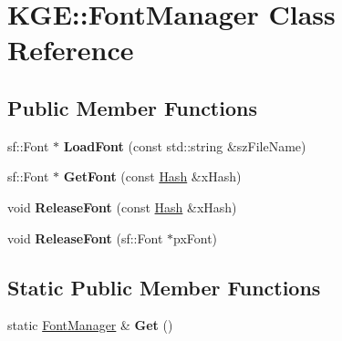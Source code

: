\hypertarget{class_k_g_e_1_1_font_manager}{\section{K\-G\-E\-:\-:Font\-Manager Class Reference}
\label{class_k_g_e_1_1_font_manager}
}
\subsection*{Public Member Functions}
\begin{DoxyCompactItemize}
\item 
\hypertarget{class_k_g_e_1_1_font_manager_aeabc37b99ae4a625e3a95939deccc5ca}{sf\-::\-Font $\ast$ {\bfseries Load\-Font} (const std\-::string \&sz\-File\-Name)}\label{class_k_g_e_1_1_font_manager_aeabc37b99ae4a625e3a95939deccc5ca}

\item 
\hypertarget{class_k_g_e_1_1_font_manager_a0c5c972ea0d8e338e782de13b9b8ed08}{sf\-::\-Font $\ast$ {\bfseries Get\-Font} (const \hyperlink{class_k_g_e_1_1_hash}{Hash} \&x\-Hash)}\label{class_k_g_e_1_1_font_manager_a0c5c972ea0d8e338e782de13b9b8ed08}

\item 
\hypertarget{class_k_g_e_1_1_font_manager_a9961469754e993e6b6e3f35be5cdd276}{void {\bfseries Release\-Font} (const \hyperlink{class_k_g_e_1_1_hash}{Hash} \&x\-Hash)}\label{class_k_g_e_1_1_font_manager_a9961469754e993e6b6e3f35be5cdd276}

\item 
\hypertarget{class_k_g_e_1_1_font_manager_aa15a96333b820a1738b43e74a40ffd36}{void {\bfseries Release\-Font} (sf\-::\-Font $\ast$px\-Font)}\label{class_k_g_e_1_1_font_manager_aa15a96333b820a1738b43e74a40ffd36}

\end{DoxyCompactItemize}
\subsection*{Static Public Member Functions}
\begin{DoxyCompactItemize}
\item 
\hypertarget{class_k_g_e_1_1_font_manager_a57a02b370049d20dd6fc4126b0619f04}{static \hyperlink{class_k_g_e_1_1_font_manager}{Font\-Manager} \& {\bfseries Get} ()}\label{class_k_g_e_1_1_font_manager_a57a02b370049d20dd6fc4126b0619f04}

\end{DoxyCompactItemize}
